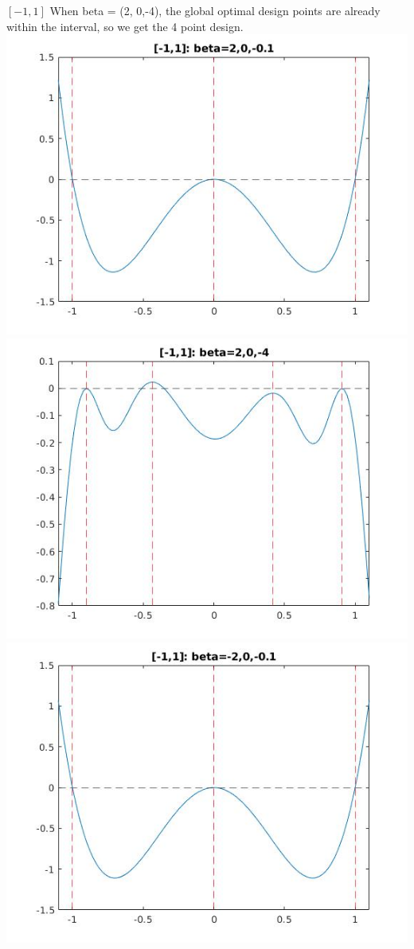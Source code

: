 \documentclass[11pt]{beamer}
\begin{document}
\begin{frame}{$[-1, 1]$}
When beta = (2, 0,-4), the global optimal design points are already within the interval, so we get the 4 point design.\\
\includegraphics[scale=0.2]{quadplots/11_1.jpg}
\includegraphics[scale=0.2]{quadplots/11_2.jpg}\\
\includegraphics[scale=0.2]{quadplots/11_3.jpg}

\end{frame}
\end{document}
